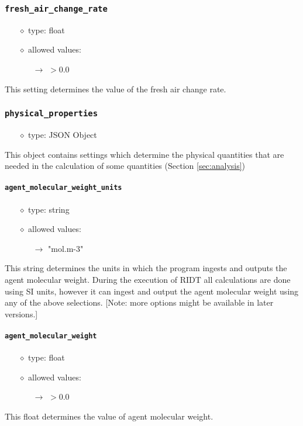 \documentclass[]{article}
\def\code#1{\texttt{#1}}
\begin{document}
\subsubsection{\code{fresh\_air\_change\_rate}}\label{sec:freshairchangerate}
\begin{itemize}
    \item[$\diamond$] type: float 
    \item[$\diamond$] allowed values:
    \begin{itemize}
        \item[$\rightarrow$] $>0.0$
    \end{itemize}
\end{itemize}
This setting determines the value of the fresh air change rate.

\subsubsection{\code{physical\_properties}}
\begin{itemize}
    \item[$\diamond$] type: JSON Object 
\end{itemize}
This object contains settings which determine the physical quantities that are
needed in the calculation of some quantities (Section \ref{sec:analysis})

\paragraph{\code{agent\_molecular\_weight\_units}}\label{sec:agentmolweightunits}
\begin{itemize}
    \item[$\diamond$] type: string 
    \item[$\diamond$] allowed values:
    \begin{itemize}
        \item[$\rightarrow$] "mol.m-3"
    \end{itemize}
\end{itemize}
This string determines the units in which the program ingests and outputs the
agent molecular weight. During the execution of RIDT all calculations are done
using SI units, however it can ingest and output the agent molecular weight
using any of the above selections. [Note: more options might be available in
later versions.]

\paragraph{\code{agent\_molecular\_weight}}\label{sec:agentmolweight}
\begin{itemize}
    \item[$\diamond$] type: float 
    \item[$\diamond$] allowed values:
    \begin{itemize}
        \item[$\rightarrow$] $>0.0$ 
    \end{itemize}
\end{itemize}
This float determines the value of agent molecular weight.
\end{document}
